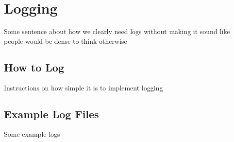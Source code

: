 \chapter{Logging}\label{ch:logging}

\iffalse
\begin{figure}[htb]
	\centering
	\texttt{[image: figs/laboratory\_configuration.png]}
	\caption{Example laboratory configuration schematic.}
	\label{fig:laboratory_configuration}
\end{figure}
\fi

Some sentence about how we clearly need logs without making it sound like people would be dense to think otherwise

\section{How to Log}

Instructions on how simple it is to implement logging

\section{Example Log Files}

Some example logs
